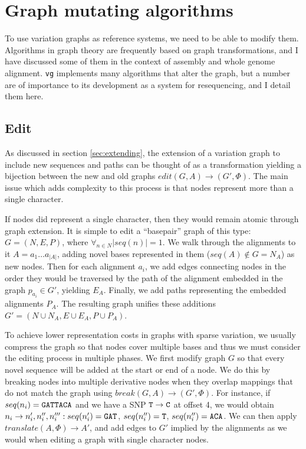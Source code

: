 \section{Graph mutating algorithms}

To use variation graphs as reference systems, we need to be able to modify them.
Algorithms in graph theory are frequently based on graph transformations, and I have discussed some of them in the context of assembly and whole genome alignment.
{\tt vg} implements many algorithms that alter the graph, but a number are of importance to its development as a system for resequencing, and I detail them here.

\subsection{Edit}

As discussed in section \ref{sec:extending}, the extension of a variation graph to include new sequences and paths can be thought of as a transformation yielding a bijection between the new and old graphs $edit(G, A) \to (G', \Phi)$.
The main issue which adds complexity to this process is that nodes represent more than a single character.

If nodes did represent a single character, then they would remain atomic through graph extension.
It is simple to edit a ``basepair'' graph of this type: $G = (N, E, P)$, where $\forall_{n \in N}{|seq(n)| = 1}$.
We walk through the alignments to it $A = a_1\ldots a_{|A|}$, adding novel bases represented in them ($seq(A) \notin G = N_A$) as new nodes.
Then for each alignment $a_i$, we add edges connecting nodes in the order they would be traversed by the path of the alignment embedded in the graph $p_{a_i} \in G'$, yielding $E_A$.
Finally, we add paths representing the embedded alignments $P_A$.
The resulting graph unifies these additions $G' = (N \cup N_A, E \cup E_A, P \cup P_A)$.

To achieve lower representation costs in graphs with sparse variation, we usually compress the graph so that nodes cover multiple bases and thus we must consider the editing process in multiple phases.
We first modify graph $G$ so that every novel sequence will be added at the start or end of a node.
We do this by breaking nodes into multiple derivative nodes when they overlap mappings that do not match the graph using $break(G, A) \to (G', \Phi)$.
For instance, if $seq(n_i) = {\tt GATTACA}$ and we have a SNP ${\tt T} \to {\tt C}$ at offset 4, we would obtain $n_i \to n_i', n_i'', n_i''' : seq(n_i') = {\tt GAT} $, $seq(n_i'') = {\tt T}$, $seq(n_i'') = {\tt ACA}$.
We can then apply $translate(A, \Phi) \to A'$, and add edges to $G'$ implied by the alignments as we would when editing a graph with single character nodes.


